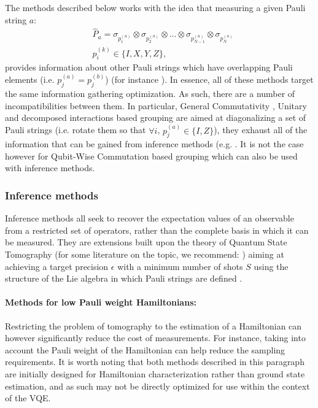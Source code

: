 The methods described below works with the idea that measuring a given Pauli string $a$: 
\begin{align}
    &\hat{P}_a = \sigma_{p^{(a)}_1} \otimes \sigma_{p^{(a)}_{2}} \otimes ... \otimes \sigma_{p^{(a)}_{N-1}} \otimes \sigma_{p^{(a)}_N} \\
    &p^{(k)}_i \in \{I, X, Y, Z\}, \nonumber
\end{align}
provides information about other Pauli strings which have overlapping Pauli elements (i.e. $p^{(a)}_j = p^{(b)}_j$) (for instance \cite{mccleanTheoryVariationalHybrid2015}). In essence, all of these methods target the same information gathering optimization. As such, there are a number of incompatibilities between them. In particular, General Commutativity \cite{Yen2020, Hamamura2020, Gokhale2019_short}, Unitary \cite{Izmaylov2020a, Zhang2020} and decomposed interactions \cite{Huggins2021} based grouping are aimed at diagonalizing a set of Pauli strings (i.e. rotate them so that $\forall i$, $p^{(a)}_j \in \{I, Z \}$), they exhaust all of the information that can be gained from inference methods (e.g. \cite{Huang2020, Torlai2020}. It is not the case however for Qubit-Wise Commutation based grouping \cite{mccleanTheoryVariationalHybrid2015, Kandala2017, Hempel2018, Rubin2018, Kokail2019, Izmaylov2019, Nam2020, Verteletskyi2020, Hamamura2020, Gokhale2019_long} which can also be used with inference methods.

\subsubsection{Inference methods}
\label{sec:pauli_grouping-inference-methods}

Inference methods all seek to recover the expectation values of an observable from a restricted set of operators, rather than the complete basis in which it can be measured. They are extensions built upon the theory of Quantum State Tomography (for some literature on the topic, we recommend: \cite{MauroDAriano2003, Cramer2010, Christandl2012, Bisio2009, ODonnell2016, ODonnell2017, Haah2017}) aiming at achieving a target precision $\epsilon$ with a minimum number of shots $S$ using the structure of the Lie algebra in which Pauli strings are defined \cite{Hall2015}. 

\paragraph{Methods for low Pauli weight Hamiltonians:} Restricting the problem of tomography to the estimation of a Hamiltonian can however significantly reduce the cost of measurements. For instance, taking into account the Pauli weight of the Hamiltonian can help reduce the sampling requirements. It is worth noting that both methods described in this paragraph are initially designed for Hamiltonian characterization rather than ground state estimation, and as such may not be directly optimized for use within the context of the VQE. 

